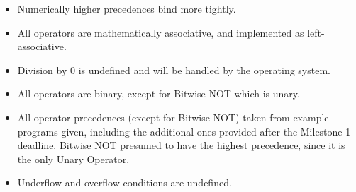 \documentclass[a4paper,11pt]{article}
\begin{document}
\begin{itemize}
\item Numerically higher precedences bind more tightly.

\item All operators are mathematically associative, and implemented as
left-associative.

\item Division by 0 is undefined and will be handled by the operating system.

\item All operators are binary, except for Bitwise NOT which is unary.

\item All operator precedences (except for Bitwise NOT) taken from example
programs given, including the additional ones provided after the Milestone 1
deadline. Bitwise NOT presumed to have the highest precedence, since it is the
only Unary Operator.

\item Underflow and overflow conditions are undefined.
\end{itemize}
\end{document}
